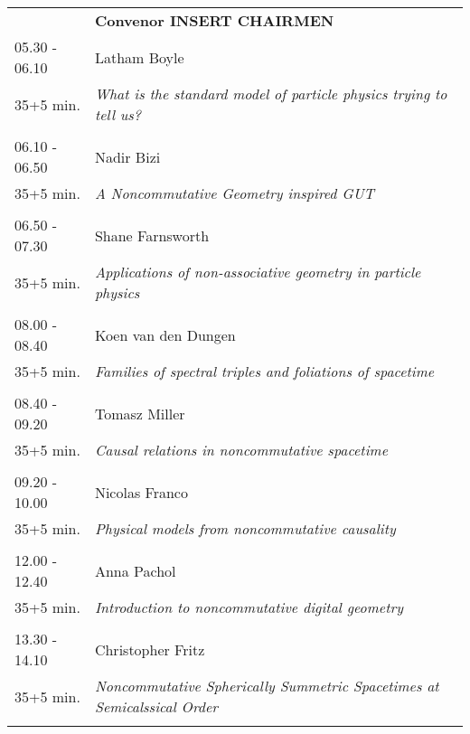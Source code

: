 \begin{longtable}{p{3cm}p{13cm}}
&\hfill {\bf Convenor INSERT CHAIRMEN }\\ 
05.30 - 06.10 & Latham Boyle\\ 
35+5 min. & {\it What is the standard model of particle physics trying to tell us?}\\ 
 & \\ 
06.10 - 06.50 & Nadir Bizi\\ 
35+5 min. & {\it A Noncommutative Geometry inspired GUT}\\ 
 & \\ 
06.50 - 07.30 & Shane Farnsworth\\ 
35+5 min. & {\it Applications of non-associative geometry in particle physics}\\ 
 & \\ 
08.00 - 08.40 & Koen van den Dungen\\ 
35+5 min. & {\it Families of spectral triples and foliations of spacetime}\\ 
 & \\ 
08.40 - 09.20 & Tomasz Miller\\ 
35+5 min. & {\it Causal relations in noncommutative spacetime}\\ 
 & \\ 
09.20 - 10.00 & Nicolas Franco\\ 
35+5 min. & {\it Physical models from noncommutative causality}\\ 
 & \\ 
12.00 - 12.40 & Anna Pachol\\ 
35+5 min. & {\it Introduction to noncommutative digital geometry}\\ 
 & \\ 
13.30 - 14.10 & Christopher Fritz\\ 
35+5 min. & {\it Noncommutative Spherically Summetric Spacetimes at Semicalssical Order}\\ 
 & \\ 
\end{longtable}

